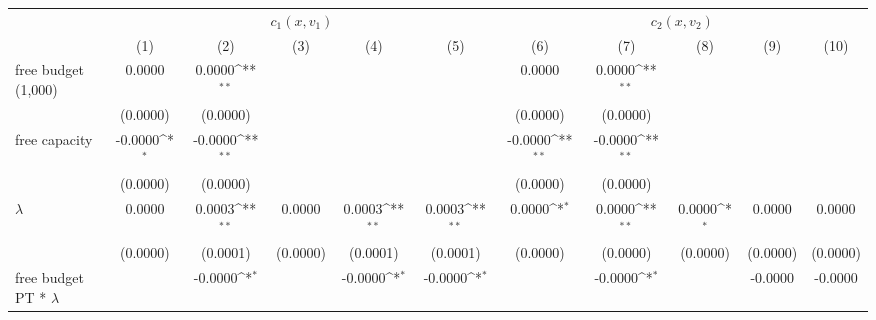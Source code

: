 {
\def\sym#1{\ifmmode^{#1}\else\(^{#1}\)\fi}
\begin{tabular}{l*{10}{c}}
\hline\hline
                    &\multicolumn{5}{c}{$ c_{1}(x,v_{1})$}                                                                        &\multicolumn{5}{c}{$ c_{2}(x,v_{2})$}                                                                        \\\cmidrule(lr){2-6}\cmidrule(lr){7-11}
                    &\multicolumn{1}{c}{(1)}         &\multicolumn{1}{c}{(2)}         &\multicolumn{1}{c}{(3)}         &\multicolumn{1}{c}{(4)}         &\multicolumn{1}{c}{(5)}         &\multicolumn{1}{c}{(6)}         &\multicolumn{1}{c}{(7)}         &\multicolumn{1}{c}{(8)}         &\multicolumn{1}{c}{(9)}         &\multicolumn{1}{c}{(10)}         \\
\hline
free budget (1,000) &      0.0000         &      0.0000\sym{**} &                     &                     &                     &      0.0000         &      0.0000\sym{**} &                     &                     &                     \\
                    &    (0.0000)         &    (0.0000)         &                     &                     &                     &    (0.0000)         &    (0.0000)         &                     &                     &                     \\
[1em]
free capacity       &     -0.0000\sym{*}  &     -0.0000\sym{**} &                     &                     &                     &     -0.0000\sym{**} &     -0.0000\sym{**} &                     &                     &                     \\
                    &    (0.0000)         &    (0.0000)         &                     &                     &                     &    (0.0000)         &    (0.0000)         &                     &                     &                     \\
[1em]
$\lambda$           &      0.0000         &      0.0003\sym{**} &      0.0000         &      0.0003\sym{**} &      0.0003\sym{**} &      0.0000\sym{*}  &      0.0000\sym{**} &      0.0000\sym{*}  &      0.0000         &      0.0000         \\
                    &    (0.0000)         &    (0.0001)         &    (0.0000)         &    (0.0001)         &    (0.0001)         &    (0.0000)         &    (0.0000)         &    (0.0000)         &    (0.0000)         &    (0.0000)         \\
[1em]
free budget PT * $\lambda$&                     &     -0.0000\sym{*}  &                     &     -0.0000\sym{*}  &     -0.0000\sym{*}  &                     &     -0.0000\sym{*}  &                     &     -0.0000         &     -0.0000         \\

\end{tabular}}
